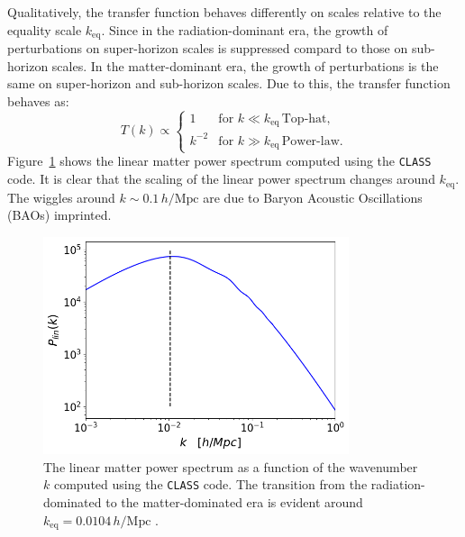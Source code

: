 Qualitatively, the transfer function behaves differently on scales relative to
the equality scale \( k_{\text{eq}} \).
Since in the radiation-dominant era, the growth of perturbations on super-horizon scales is suppressed compard to those on sub-horizon scales. In the matter-dominant era, the growth of perturbations is the same on super-horizon and sub-horizon scales. Due to this, the transfer function behaves as:
\begin{equation}
    T(k) \propto 
    \begin{cases}
        1 & \text{for } k \ll k_{\text{eq}}\, \text{Top-hat} , \\
        k^{-2} & \text{for } k \gg k_{\text{eq}}\, \text{Power-law}.
    \end{cases}
\end{equation}
Figure~\ref{fig:linear_power_spectrum} shows the linear matter power spectrum computed using the \texttt{CLASS} code. It is clear that the scaling of the linear power spectrum changes around $k_{\text{eq}}$. The wiggles around \( k \sim 0.1\, h/\text{Mpc} \) are due to Baryon Acoustic Oscillations (BAOs) imprinted.
\begin{figure}[ht]
    \centering
    \includegraphics[width=0.8\textwidth]{figures/class.png}
    \caption[Linear Matter Power Spectrum by \texttt{CLASS}]{The linear matter power spectrum as a function of the wavenumber \( k \) computed using the \texttt{CLASS} code. The transition from the radiation-dominated to the matter-dominated era is evident around \( k_{\text{eq}} = 0.0104\, h/\text{Mpc} \) \citep{2020A&A...641A...6P}.
    }
    \label{fig:linear_power_spectrum}
\end{figure}

